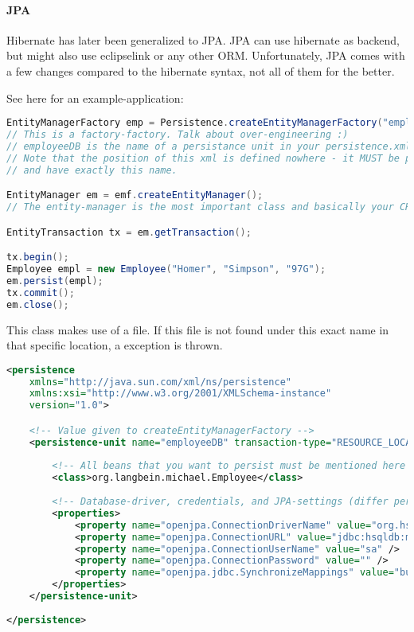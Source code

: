 \paragraph{JPA} Hibernate has later been generalized to JPA. JPA can use hibernate as backend, but might also use eclipselink or any other ORM. Unfortunately, JPA comes with a few changes compared to the hibernate syntax, not all of them for the better.

See here for an example-application: 

\begin{lstlisting}[language=java]
EntityManagerFactory emp = Persistence.createEntityManagerFactory("employeeDB"); 
// This is a factory-factory. Talk about over-engineering :)
// employeeDB is the name of a persistance unit in your persistence.xml. 
// Note that the position of this xml is defined nowhere - it MUST be placed in classroot/META-INF/persistence.xml
// and have exactly this name.

EntityManager em = emf.createEntityManager();
// The entity-manager is the most important class and basically your CRUD-Interface to the database.

EntityTransaction tx = em.getTransaction();

tx.begin();
Employee empl = new Employee("Homer", "Simpson", "97G");
em.persist(empl);
tx.commit();
em.close();
\end{lstlisting}

This class makes use of a  file. If this file is not found under this exact name in that specific location, a  exception is thrown. 

\begin{lstlisting}[language=xml]
<persistence 
    xmlns="http://java.sun.com/xml/ns/persistence"
    xmlns:xsi="http://www.w3.org/2001/XMLSchema-instance" 
    version="1.0">

    <!-- Value given to createEntityManagerFactory -->
    <persistence-unit name="employeeDB" transaction-type="RESOURCE_LOCAL">
    
        <!-- All beans that you want to persist must be mentioned here -->
        <class>org.langbein.michael.Employee</class>
        
        <!-- Database-driver, credentials, and JPA-settings (differ per vendor, but generally logging, create tables etc) -->
        <properties>
            <property name="openjpa.ConnectionDriverName" value="org.hsqldb.jdbcDriver" />
            <property name="openjpa.ConnectionURL" value="jdbc:hsqldb:mem:order" />
            <property name="openjpa.ConnectionUserName" value="sa" />
            <property name="openjpa.ConnectionPassword" value="" />
            <property name="openjpa.jdbc.SynchronizeMappings" value="buildSchema" />
        </properties>
    </persistence-unit>
    
</persistence>
\end{lstlisting}

